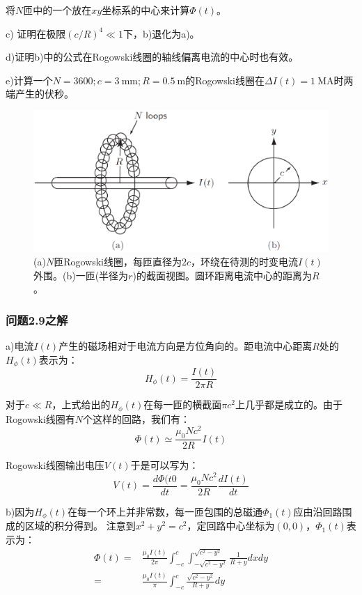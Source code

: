 将$N$匝中的一个放在$xy$坐标系的中心来计算$\Phi(t)$。

c) 证明在极限$(c/R)^4\ll 1$下，b)退化为a)。

d)证明b)中的公式在Rogowski线圈的轴线偏离电流的中心时也有效。

e)计算一个$N = 3600; c = 3\ \mathrm{mm}; R = 0.5\ \mathrm{m}$的Rogowski线圈在$\Delta I(t)=1\ \mathrm{MA}$时两端产生的伏秒。

\begin{figure}[htbp]
  \centering
 \includegraphics[scale=0.4]{chpt2/figs/fig2.14.eps}
  \caption{(a)$N$匝Rogowski线圈，每匝直径为$2c$，环绕在待测的时变电流$I(t)$外围。(b)一匝(半径为$r$)的截面视图。圆环距离电流中心的距离为$R$。}
\end{figure}

\subsubsection{问题2.9之解}
a)电流$I(t)$产生的磁场相对于电流方向是方位角向的。距电流中心距离$R$处的$H_\phi(t)$表示为：
\begin{equation*}
H_\phi (t)=\frac{I(t)}{2\pi R} \tag{S9.1}
\end{equation*}

对于$c\ll R$，上式给出的$H_\phi(t)$在每一匝的横截面$\pi c^2$上几乎都是成立的。由于Rogowski线圈有$N$个这样的回路，我们有：
\begin{equation*}
\Phi(t)\simeq \frac{\mu_0 N c^2}{2R}I(t)  \tag{2.69}
\end{equation*}

Rogowski线圈输出电压$V(t)$于是可以写为：
\begin{equation*}
V(t)=\frac{d\Phi(t0}{dt}=\frac{\mu_0 N c^2}{2R}\frac{dI(t)}{dt}  \tag{S9.2}
\end{equation*}

b)因为$H_\phi (t)$在每一个环上并非常数，每一匝包围的总磁通$\Phi_1(t)$应由沿回路围成的区域的积分得到。
注意到$x^2+y^2=c^2$，定回路中心坐标为$(0,0)$，$\Phi_1(t)$表示为：
\begin{align}
\Phi (t)=&\frac{\mu_0 I(t)}{2\pi}\int_{-c}^{c}\int_{-\sqrt{c^2-y^2}}^{\sqrt{c^2-y^2}}\frac{1}{R+y}dxdy\nonumber\\
=&\frac{\mu_0 I(t)}{\pi}\int_{-c}^{c}\frac{\sqrt{c^2-y^2}}{R+y}dy\nonumber\tag{S9.3}
\end{align}

